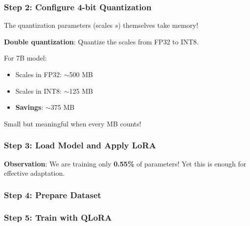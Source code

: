\documentclass{article}
\begin{document}
\subsubsection{Step 2: Configure 4-bit Quantization}


\begin{tcolorbox}[colback=yellow!5!white, colframe=orange!50!black, title=What is Double Quantization?]
The quantization parameters (scales $s$) themselves take memory!

\textbf{Double quantization}: Quantize the scales from FP32 to INT8.

For 7B model:
\begin{itemize}
\item Scales in FP32: $\sim$500 MB
\item Scales in INT8: $\sim$125 MB
\item \textbf{Savings}: $\sim$375 MB
\end{itemize}

Small but meaningful when every MB counts!
\end{tcolorbox}

\subsubsection{Step 3: Load Model and Apply LoRA}


\textbf{Observation}: We are training only \textbf{0.55\%} of parameters! Yet this is enough for effective adaptation.

\subsubsection{Step 4: Prepare Dataset}


\subsubsection{Step 5: Train with QLoRA}

\end{document}

